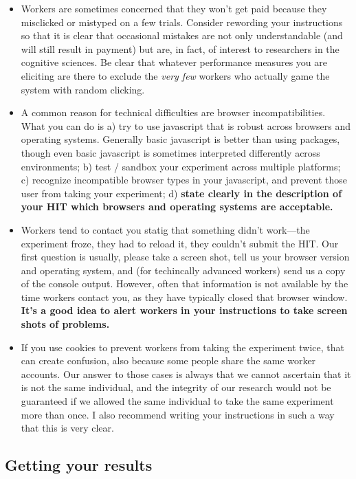 \documentclass{article}
\begin{document}
\begin{itemize}
	\item Workers are sometimes concerned that they won't get paid because they misclicked or mistyped on a few trials. Consider rewording your instructions so that it is clear that occasional mistakes are not only understandable (and will still result in payment) but are, in fact, of interest to researchers in the cognitive sciences. Be clear that whatever performance measures you are eliciting are there to exclude the {\em very few} workers who actually game the system with random clicking.
	\item A common reason for technical difficulties are browser incompatibilities. What you can do is a) try to use javascript that is robust across browsers and operating systems. Generally basic javascript is better than using packages, though even basic javascript is sometimes interpreted differently across environments; b) test / sandbox your experiment across multiple platforms; c) recognize incompatible browser types in your javascript, and prevent those user from taking your experiment; d) {\bf state clearly in the description of your HIT which browsers and operating systems are acceptable.}
	\item Workers tend to contact you statig that something didn't work---the experiment froze, they had to reload it, they couldn't submit the HIT. Our first question is usually, please take a screen shot, tell us your browser version and operating system, and (for techincally advanced workers) send us a copy of the console output. However, often that information is not available by the time workers contact you, as they have typically closed that browser window. {\bf It's a good idea to alert workers in your instructions to take screen shots of problems.}
	\item If you use cookies to prevent workers from taking the experiment twice, that can create confusion, also because some people share the same worker accounts. Our answer to those cases is always that we cannot ascertain that it is not the same individual, and the integrity of our research would not be guaranteed if we allowed the same individual to take the same experiment more than once. I also recommend writing your instructions in such a way that this is very clear.

\end{itemize}


\subsection{Getting your results}
\end{document}
